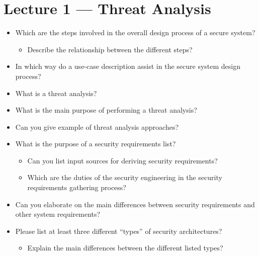 \section{Lecture 1 --- Threat Analysis}
\begin{itemize}
\item Which are the steps involved in the overall design process of a secure system?
  \begin{itemize}[noitemsep]
  \item Describe the relationship between the different steps?
  \end{itemize}

\item In which way do a use-case description assist in the secure system design process?
\item What is a threat analysis?
\item What is the main purpose of performing a threat analysis?
\item Can you give example of threat analysis approaches?
\item What is the purpose of a security requirements list?
  \begin{itemize}[noitemsep]
  \item Can you list input sources for deriving security requirements?
  \item Which are the duties of the security engineering in the security requirements gathering process?
  \end{itemize}

\item Can you elaborate on the main differences between security requirements and other system requirements?
\item Please list at least three different “types” of security architectures?
  \begin{itemize}[noitemsep]
  \item Explain the main differences between the different
    listed types?
  \end{itemize}


\end{itemize}
